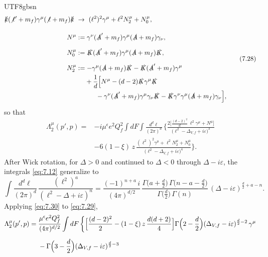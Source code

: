 \documentclass[11pt,a4paper,oneside]{report}
\begin{document}
\begin{CJK*}{UTF8}{gbsn}
\begin{equation*}
\begin{aligned}
\slashed{k}(\not\ell'+m_f)\gamma^\mu(\not\ell+m_f)\slashed{k}\ &\to\ (\ell^2)^2\gamma^\mu+\ell^2N_2^\mu+N_0^\mu,\\[10pt]
N^\mu&:=\gamma^\nu(\slashed{A}'+m_f)\gamma^\mu(\slashed{A}+m_f)\gamma_\nu,\\[6pt]
N_0^\mu&:=\slashed{K}(\slashed{A}'+m_f)\gamma^\mu(\slashed{A}+m_f)\slashed{K},\\[6pt]
N_2^\mu&:=-\gamma^\mu(\slashed{A}+m_f)\slashed{K}-\slashed{K}(\slashed{A}'+m_f)\gamma^\mu\\
&\quad\ +\frac1d\Bigl[N^\mu-(d-2)\slashed{K}\gamma^\mu\slashed{K}\\
&\qquad\quad-\gamma^\nu(\slashed{A}'+m_f)\gamma^\mu\gamma_\nu\slashed{K}-\slashed{K}\gamma^\nu\gamma^\mu(\slashed{A}+m_f)\gamma_\nu\Bigr],
\end{aligned}
\tag{7.28}\label{eq:7.28}
\end{equation*}
so that
\begin{equation*}
\begin{aligned}
\Lambda_2^\mu(p',p)
={}&-i\mu^{\epsilon}e^2Q_f^2\int dF\int\frac{d^d\ell}{(2\pi)^d}\,\biggl\{
\frac{2\bigl[\frac{(d-2)^2}{d}\,\ell^2\gamma^\mu+N^\mu\bigr]}{\bigl(\ell^2-\Delta_{V,f}+i\varepsilon\bigr)^3}\\[6pt]
&-6(1-\xi)\,z\,\frac{(\ell^2)^2\gamma^\mu+\ell^2N_2^\mu+N_0^\mu}{\bigl(\ell^2-\Delta_{V,f}+i\varepsilon\bigr)^4}\biggr\}.
\end{aligned}
\tag{7.29}\label{eq:7.29}
\end{equation*}
After Wick rotation, for $\Delta>0$ and continued to $\Delta<0$ through $\Delta-i\varepsilon$, the integrals \eqref{eq:7.12} generalize to
\begin{equation*}
\int\frac{d^d\ell}{(2\pi)^d}\,\frac{(\ell^2)^a}{(\ell^2-\Delta+i\varepsilon)^n}
=\frac{(-1)^{n+a}\,i}{(4\pi)^{d/2}}\,
\frac{\Gamma\bigl(a+\frac d2\bigr)\,\Gamma\bigl(n-a-\frac d2\bigr)}{\Gamma\bigl(\frac d2\bigr)\,\Gamma(n)}\,
(\Delta-i\varepsilon)^{\frac d2+a-n}.
\tag{7.30}\label{eq:7.30}
\end{equation*}
Applying \eqref{eq:7.30} to \eqref{eq:7.29},
\begin{equation*}
\begin{aligned}
\Lambda_2^\mu(p',p)
={}&\frac{\mu^{\epsilon}e^2Q_f^2}{(4\pi)^{d/2}}\int dF\,\biggl\{
\Bigl[\frac{(d-2)^2}{2}-(1-\xi)\,z\,\frac{d(d+2)}{4}\Bigr]
\Gamma\Bigl(2-\frac d2\Bigr)(\Delta_{V,f}-i\varepsilon)^{\frac d2-2}\,\gamma^\mu\\[6pt]
&-\Gamma\Bigl(3-\frac d2\Bigr)(\Delta_{V,f}-i\varepsilon)^{\frac d2-3}

\end{aligned}
\end{equation*}
\end{CJK*}
\end{document}
